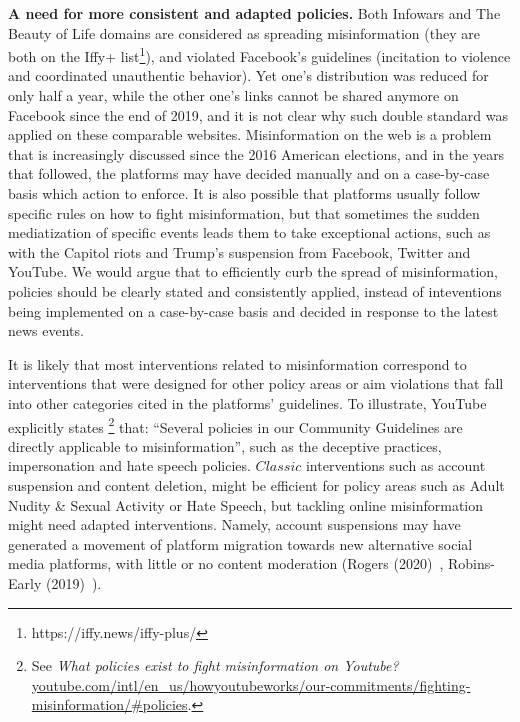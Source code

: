 \documentclass{article}
\begin{document}
\smallskip

{\bf A need for more consistent and adapted policies.}
Both Infowars and The Beauty of Life domains are considered as spreading misinformation (they are both on the Iffy+ list\footnote{https://iffy.news/iffy-plus/}), and violated Facebook's guidelines (incitation to violence and coordinated unauthentic behavior). 
Yet one's distribution was reduced for only half a year, while the other one's links cannot be shared anymore on Facebook since the end of 2019, and it is not clear why such double standard was applied on these comparable websites.
Misinformation on the web is a problem that is increasingly discussed since the 2016 American elections, and in the years that followed, the platforms may have decided manually and on a case-by-case basis which action to enforce.
It is also possible that platforms usually follow specific rules on how to fight misinformation, but that sometimes the sudden mediatization of specific events leads them to take exceptional actions, such as with the Capitol riots and Trump's suspension from Facebook, Twitter and YouTube.
We would argue that to efficiently curb the spread of misinformation, policies should be clearly stated and consistently applied, instead of inteventions being implemented on a case-by-case basis and decided in response to the latest news events.

\smallskip

It is likely that most interventions related to misinformation correspond to interventions that were designed for other policy areas or aim violations that fall into other categories cited in the platforms' guidelines.
To illustrate, YouTube explicitly states
\footnote{See {\it What policies exist to fight misinformation on Youtube?} \href{https://www.youtube.com/intl/en\_us/howyoutubeworks/our-commitments/fighting-misinformation/\#policies}{youtube.com/intl/en\_us/howyoutubeworks/our-commitments/fighting-misinformation/\#policies}.}
that: ``Several policies in our Community Guidelines are directly applicable to misinformation'', such as the deceptive practices, impersonation and hate speech policies.
$Classic$ interventions such as account suspension and content deletion, might be efficient for policy areas such as Adult Nudity \& Sexual Activity or Hate Speech, but tackling online misinformation might need adapted interventions.
Namely, account suspensions may have generated a movement of platform migration towards new alternative social media platforms, with little or no content moderation (Rogers (2020)~\cite{rogers2020}, Robins-Early (2019)~\cite{huffpost}).
\end{document}
